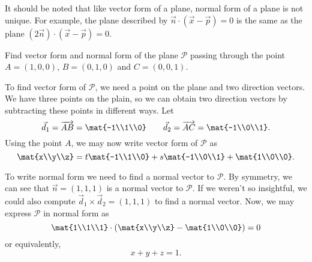 It should be noted that like vector form of a plane, normal form of a plane is not unique.
For example, the plane described by $\vec n\cdot(\vec x-\vec p)=0$ is the same as the 
plane $(2\vec n)\cdot(\vec x-\vec p)=0$.

\begin{example}
	Find vector form and normal form of the plane $\mathcal P$ passing
	through the point $A=(1,0,0)$, $B=(0,1,0)$ and $C=(0,0,1)$.

	To find vector form of $\mathcal P$, we need a point on the plane and
	two direction vectors.  We have three points on the plain, so we can
	obtain two direction vectors by subtracting these points in different ways.
	Let 
	\[
		\vec d_1=\overrightarrow{AB} = \mat{-1\\1\\0}\qquad\vec d_2=\overrightarrow{AC}=
		\mat{-1\\0\\1}.
	\]
	Using the point $A$, we may now write vector form of $\mathcal P$ as
	\[
		\mat{x\\y\\z} = t\mat{-1\\1\\0}+s\mat{-1\\0\\1}+\mat{1\\0\\0}.
	\]

	To write normal form we need to find a normal vector to $\mathcal P$.  By symmetry,
	we can see that $\vec n=(1,1,1)$ is a normal vector to $\mathcal P$.  If we weren't
	so insightful, we could also compute $\vec d_1\times \vec d_2 = (1,1,1)$ to find a
	normal vector.  Now, we may express $\mathcal P$ in normal form as
	\[
		\mat{1\\1\\1}\cdot\left(\mat{x\\y\\z}-\mat{1\\0\\0}\right)=0
	\]
	or equivalently,
	\[
		x+y+z=1.
	\]
\end{example}

